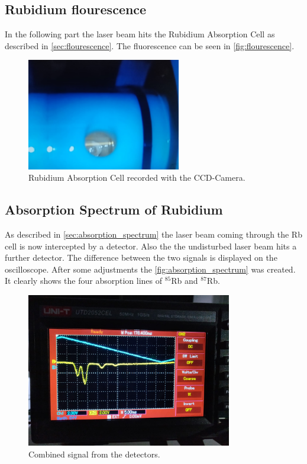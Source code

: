\FloatBarrier

\subsection{Rubidium flourescence}
\label{sec:rubidium}

In the following part the laser beam hits the Rubidium Absorption Cell as described in \autoref{sec:flourescence}.
The fluorescence can be seen in \autoref{fig:flourescence}.
\begin{figure}
    \centering
    \includegraphics[width=0.6\textwidth]{content/data/flourescence_scaled.jpeg}
    \caption{Rubidium Absorption Cell recorded with the CCD-Camera.}
    \label{fig:flourescence}
\end{figure}
\FloatBarrier

\clearpage
\subsection{Absorption Spectrum of Rubidium}
\label{sec:absorption}

As described in \autoref{sec:absorption_spectrum} the laser beam coming through the Rb cell is now intercepted by a detector.
Also the the undisturbed laser beam hits a further detector.
The difference between the two signals is displayed on the oscilloscope.
After some adjustments the \autoref{fig:absorption_spectrum} was created.
It clearly shows the four absorption lines of $^{85}$Rb and $^{87}$Rb.
\begin{figure}
    \centering
    \includegraphics[width=0.8\textwidth]{content/data/Absorption_spectrum.jpeg}
    \caption{Combined signal from the detectors.}
    \label{fig:absorption_spectrum}
\end{figure}